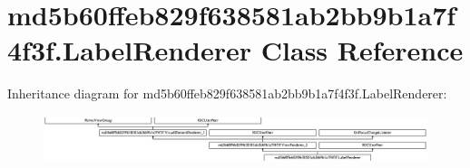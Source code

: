 \hypertarget{classmd5b60ffeb829f638581ab2bb9b1a7f4f3f_1_1LabelRenderer}{}\section{md5b60ffeb829f638581ab2bb9b1a7f4f3f.\+Label\+Renderer Class Reference}
\label{classmd5b60ffeb829f638581ab2bb9b1a7f4f3f_1_1LabelRenderer}
Inheritance diagram for md5b60ffeb829f638581ab2bb9b1a7f4f3f.\+Label\+Renderer\+:\begin{figure}[H]
\begin{center}
\leavevmode
\includegraphics[height=1.403509cm]{classmd5b60ffeb829f638581ab2bb9b1a7f4f3f_1_1LabelRenderer}
\end{center}
\end{figure}
